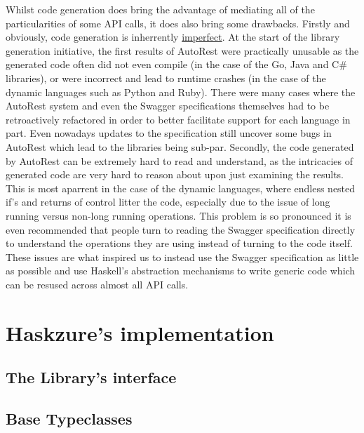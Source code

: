 \documentclass[11pt]{report}
\begin{document}
Whilst code generation does bring the advantage of mediating all of the
particularities of some API calls, it does also bring some drawbacks. \newline
Firstly and obviously, code generation is inherrently \ul{imperfect}. At the
start of the library generation initiative, the first results of AutoRest
were practically unusable as the generated code often did not even compile (in the
case of the Go, Java and C\# libraries), or were incorrect and lead to runtime
crashes (in the case of the dynamic languages such as Python and Ruby). There
were many cases where the AutoRest system and even the Swagger specifications
themselves had to be retroactively refactored in order to better facilitate
support for each language in part. Even nowadays updates to the specification
still uncover some bugs in AutoRest which lead to the libraries being sub-par.
\newline
Secondly, the code generated by AutoRest can be extremely hard to read and
understand, as the intricacies of generated code are very hard to reason about
upon just examining the results. This is most aparrent in the case of the
dynamic languages, where endless nested if's and returns of control litter the
code, especially due to the issue of long running versus non-long running
operations. This problem is so pronounced it is even recommended that people
turn to reading the Swagger specification directly to understand the operations
they are using instead of turning to the code itself. \newline
These issues are what inspired us to instead use the Swagger specification as
little as possible and use Haskell's abstraction mechanisms to write generic
code which can be resused across almost all API calls.


\chapter{Haskzure's implementation}

\section{The Library's interface} %

\section{Base Typeclasses}
\end{document}
